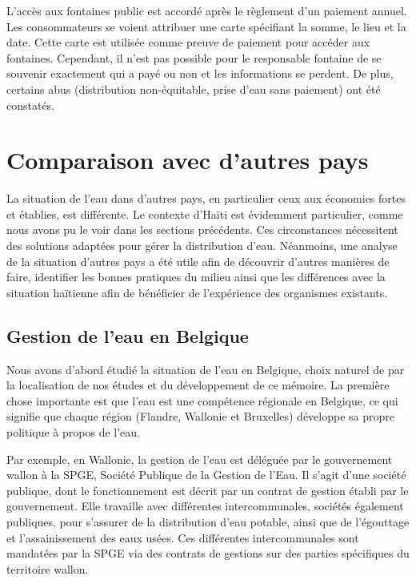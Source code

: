 \documentclass{eplmastersthesis_FR}
\begin{document}
    			L'accès aux fontaines public est accordé après le règlement d'un paiement annuel. Les consommateurs se voient attribuer une carte spécifiant la somme, le lieu et la date. Cette carte est utilisée comme preuve de paiement pour accéder aux fontaines. Cependant, il n'est pas possible pour le responsable fontaine de se souvenir exactement qui a payé ou non et les informations se perdent. De plus, certains abus (distribution non-équitable, prise d'eau sans paiement) ont été constatés.


		\section{Comparaison avec d'autres pays}

			La situation de l'eau dans d'autres pays, en particulier ceux aux économies fortes et établies, est différente. Le contexte d'Haïti est évidemment particulier, comme nous avons pu le voir dans les sections précédents. Ces circonstances nécessitent des solutions adaptées pour gérer la distribution d'eau. Néanmoins, une analyse de la situation d'autres pays a été utile afin de découvrir d'autres manières de faire, identifier les bonnes pratiques du milieu ainsi que les différences avec la situation haïtienne afin de bénéficier de l'expérience des organismes existants.

			\subsection*{Gestion de l'eau en Belgique}

				Nous avons d'abord étudié la situation de l'eau en Belgique, choix naturel de par la localisation de nos études et du développement de ce mémoire. La première chose importante est que l'eau est une compétence régionale en Belgique, ce qui signifie que chaque région (Flandre, Wallonie et Bruxelles) développe sa propre politique à propos de l'eau.

				Par exemple, en Wallonie, la gestion de l'eau est déléguée par le gouvernement wallon à la SPGE, Société Publique de la Gestion de l'Eau. Il s'agit d'une société publique, dont le fonctionnement est décrit par un contrat de gestion établi par le gouvernement. Elle travaille avec différentes intercommunales, sociétés également publiques, pour s'assurer de la distribution d'eau potable, ainsi que de l'égouttage et l'assainissement des eaux usées. Ces différentes intercommunales sont mandatées par la SPGE via des contrats de gestions sur des parties spécifiques du territoire wallon.
\end{document}
